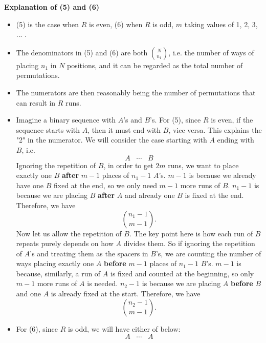\documentclass[12pt]{article}
\theoremstyle{plain}
\theoremstyle{definition}
\theoremstyle{remark}
\begin{document}
\textbf{Explanation of (5) and (6)}
\begin{itemize}
    \item (5) is the case when $R$ is even, (6) when $R$ is odd, $m$ taking values of 1, 2, 3, ... .
    \item The denominators in (5) and (6) are both $\binom{N}{n_1}$, i.e. the number of ways of placing $n_1$ in $N$ positions, and it can be regarded as the total number of permutations. 
    \item The numerators are then reasonably being the number of permutations that can result in $R$ runs.
    \item Imagine a binary sequence with $A$'s and $B$'s. For (5), since $R$ is even, if the sequence starts with $A$, then it must end with $B$, vice versa. This explains the "2" in the numerator. We will consider the case starting with $A$ ending with $B$, i.e. $$A\;\;\; \cdots \;\;\; B$$Ignoring the repetition of $B$, in order to get $2m$ runs, we want to place exactly one $B$ \textbf{after} $m-1$ places of $n_1-1$ $A$'s. $m-1$ is because we already have one $B$ fixed at the end, so we only need $m-1$ more runs of $B$. $n_1-1$ is because we are placing $B$ \textbf{after} $A$ and already one $B$ is fixed at the end. Therefore, we have $$\binom{n_1-1}{m-1}.$$ Now let us allow the repetition of $B$. The key point here is how each run of $B$ repeats purely depends on how $A$ divides them. So if ignoring the repetition of $A$'s and treating them as the spacers in $B$'s, we are counting the number of ways placing exactly one $A$ \textbf{before} $m-1$ places of $n_1-1$ $B$'s. $m-1$ is because, similarly, a run of $A$ is fixed and counted at the beginning, so only $m-1$ more runs of $A$ is needed. $n_2-1$ is because we are placing $A$ \textbf{before} $B$ and one $A$ is already fixed at the start. Therefore, we have $$\binom{n_2-1}{m-1}.$$
    \item For (6), since $R$ is odd, we will have either of below: $$A\;\;\; \cdots \;\;\; A$$

\end{itemize}
\end{document}
